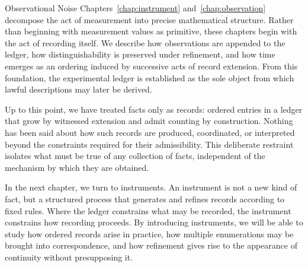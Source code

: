 \begin{coda}{Observational Noise}
Chapters~\ref{chap:instrument} and~\ref{chap:observation} decompose the act of
measurement into precise mathematical structure.  Rather than beginning with
measurement values as primitive, these chapters begin with the act of
recording itself.  We describe how observations are appended to the ledger,
how distinguishability is preserved under refinement, and how time emerges as
an ordering induced by successive acts of record extension.  From this
foundation, the experimental ledger is established as the sole object from
which lawful descriptions may later be derived.


\end{coda}

Up to this point, we have treated facts only as records: ordered entries in a
ledger that grow by witnessed extension and admit counting by construction.
Nothing has been said about how such records are produced, coordinated, or
interpreted beyond the constraints required for their admissibility.  This
deliberate restraint isolates what must be true of any collection of facts,
independent of the mechanism by which they are obtained.

In the next chapter, we turn to instruments.  An instrument is not a new kind of
fact, but a structured process that generates and refines records according to
fixed rules.  Where the ledger constrains what may be recorded, the instrument
constrains how recording proceeds.  By introducing instruments, we will be able
to study how ordered records arise in practice, how multiple enumerations may be
brought into correspondence, and how refinement gives rise to the appearance of
continuity without presupposing it.

